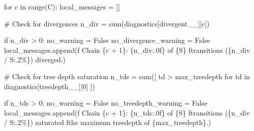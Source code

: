 \documentclass[
  letterpaper,
  DIV=11,
  numbers=noendperiod]{scrartcl}
\newenvironment{Shaded}{\begin{snugshade}}{\end{snugshade}}
\newcommand{\BuiltInTok}[1]{\textcolor[rgb]{0.00,0.23,0.31}{#1}}
\newcommand{\CommentTok}[1]{\textcolor[rgb]{0.37,0.37,0.37}{#1}}
\newcommand{\ControlFlowTok}[1]{\textcolor[rgb]{0.00,0.23,0.31}{#1}}
\newcommand{\DecValTok}[1]{\textcolor[rgb]{0.68,0.00,0.00}{#1}}
\newcommand{\KeywordTok}[1]{\textcolor[rgb]{0.00,0.23,0.31}{#1}}
\newcommand{\NormalTok}[1]{\textcolor[rgb]{0.00,0.23,0.31}{#1}}
\newcommand{\OperatorTok}[1]{\textcolor[rgb]{0.37,0.37,0.37}{#1}}
\newcommand{\SpecialCharTok}[1]{\textcolor[rgb]{0.37,0.37,0.37}{#1}}
\newcommand{\SpecialStringTok}[1]{\textcolor[rgb]{0.13,0.47,0.30}{#1}}
\newcommand{\StringTok}[1]{\textcolor[rgb]{0.13,0.47,0.30}{#1}}
\newcommand{\VariableTok}[1]{\textcolor[rgb]{0.07,0.07,0.07}{#1}}
\begin{document}
\begin{Shaded}
\begin{Highlighting}[]
  \ControlFlowTok{for}\NormalTok{ c }\KeywordTok{in} \BuiltInTok{range}\NormalTok{(C):}
\NormalTok{    local\_messages }\OperatorTok{=}\NormalTok{ []}
    
    \CommentTok{\# Check for divergences}
\NormalTok{    n\_div }\OperatorTok{=} \BuiltInTok{sum}\NormalTok{(diagnostics[}\StringTok{\textquotesingle{}divergent\_\_\textquotesingle{}}\NormalTok{][c])}
    
    \ControlFlowTok{if}\NormalTok{ n\_div }\OperatorTok{\textgreater{}} \DecValTok{0}\NormalTok{:}
\NormalTok{      no\_warning }\OperatorTok{=} \VariableTok{False}
\NormalTok{      no\_divergence\_warning }\OperatorTok{=} \VariableTok{False}
\NormalTok{      local\_messages.append(}\SpecialStringTok{f\textquotesingle{}  Chain }\SpecialCharTok{\{}\NormalTok{c }\OperatorTok{+} \DecValTok{1}\SpecialCharTok{\}}\SpecialStringTok{: }\SpecialCharTok{\{}\NormalTok{n\_div}\SpecialCharTok{:.0f\}}\SpecialStringTok{ of }\SpecialCharTok{\{}\NormalTok{S}\SpecialCharTok{\}}\SpecialStringTok{ \textquotesingle{}}
                            \SpecialStringTok{f\textquotesingle{}transitions (}\SpecialCharTok{\{}\NormalTok{n\_div }\OperatorTok{/}\NormalTok{ S}\SpecialCharTok{:.2\%\}}\SpecialStringTok{) diverged.\textquotesingle{}}\NormalTok{)}
    
    \CommentTok{\# Check for tree depth saturation}
\NormalTok{    n\_tds }\OperatorTok{=} \BuiltInTok{sum}\NormalTok{([ td }\OperatorTok{\textgreater{}}\NormalTok{ max\_treedepth }
                  \ControlFlowTok{for}\NormalTok{ td }\KeywordTok{in}\NormalTok{ diagnostics[}\StringTok{\textquotesingle{}treedepth\_\_\textquotesingle{}}\NormalTok{][}\DecValTok{0}\NormalTok{] ])}
    
    \ControlFlowTok{if}\NormalTok{ n\_tds }\OperatorTok{\textgreater{}} \DecValTok{0}\NormalTok{:}
\NormalTok{      no\_warning }\OperatorTok{=} \VariableTok{False}
\NormalTok{      no\_treedepth\_warning }\OperatorTok{=} \VariableTok{False}
\NormalTok{      local\_messages.append(}\SpecialStringTok{f\textquotesingle{}  Chain }\SpecialCharTok{\{}\NormalTok{c }\OperatorTok{+} \DecValTok{1}\SpecialCharTok{\}}\SpecialStringTok{: }\SpecialCharTok{\{}\NormalTok{n\_tds}\SpecialCharTok{:.0f\}}\SpecialStringTok{ of }\SpecialCharTok{\{}\NormalTok{S}\SpecialCharTok{\}}\SpecialStringTok{ \textquotesingle{}}
                            \SpecialStringTok{f\textquotesingle{}transitions (}\SpecialCharTok{\{}\NormalTok{n\_div }\OperatorTok{/}\NormalTok{ S}\SpecialCharTok{:.2\%\}}\SpecialStringTok{) saturated \textquotesingle{}}
                            \SpecialStringTok{f\textquotesingle{}the maximum treedepth of }\SpecialCharTok{\{}\NormalTok{max\_treedepth}\SpecialCharTok{\}}\SpecialStringTok{.\textquotesingle{}}\NormalTok{)}
    

\end{Highlighting}
\end{Shaded}
\end{document}
